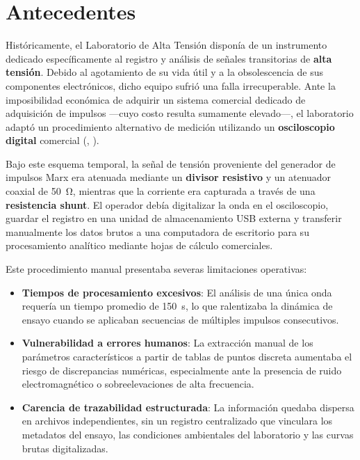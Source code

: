 \section{Antecedentes} \label{sec:antecedentes}

Históricamente, el Laboratorio de Alta Tensión disponía de un instrumento dedicado específicamente al registro y análisis de señales transitorias de \textbf{alta tensión}. Debido al agotamiento de su vida útil y a la obsolescencia de sus componentes electrónicos, dicho equipo sufrió una falla irrecuperable. Ante la imposibilidad económica de adquirir un sistema comercial dedicado de adquisición de impulsos —cuyo costo resulta sumamente elevado—, el laboratorio adaptó un procedimiento alternativo de medición utilizando un \textbf{osciloscopio digital} comercial (\cite{gds1000au_ProgrammingManual}, \cite{gds1000au_driver}).

Bajo este esquema temporal, la señal de tensión proveniente del generador de impulsos Marx era atenuada mediante un \textbf{divisor resistivo} y un atenuador coaxial de \qty{50}{\ohm}, mientras que la corriente era capturada a través de una \textbf{resistencia shunt}. El operador debía digitalizar la onda en el osciloscopio, guardar el registro en una unidad de almacenamiento USB externa y transferir manualmente los datos brutos a una computadora de escritorio para su procesamiento analítico mediante hojas de cálculo comerciales.

Este procedimiento manual presentaba severas limitaciones operativas:
\begin{itemize}
    \item \textbf{Tiempos de procesamiento excesivos}: El análisis de una única onda requería un tiempo promedio de \qty{150}{\second}, lo que ralentizaba la dinámica de ensayo cuando se aplicaban secuencias de múltiples impulsos consecutivos.
    \item \textbf{Vulnerabilidad a errores humanos}: La extracción manual de los parámetros característicos a partir de tablas de puntos discreta aumentaba el riesgo de discrepancias numéricas, especialmente ante la presencia de ruido electromagnético o sobreelevaciones de alta frecuencia.
    \item \textbf{Carencia de trazabilidad estructurada}: La información quedaba dispersa en archivos independientes, sin un registro centralizado que vinculara los metadatos del ensayo, las condiciones ambientales del laboratorio y las curvas brutas digitalizadas.
\end{itemize}

